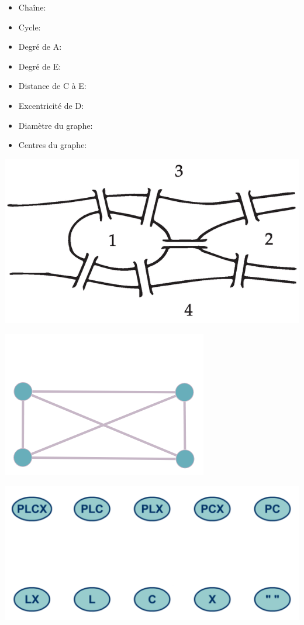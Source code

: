 \documentclass[a4paper,11pt]{article}
\begin{document}
\begin{multicols}{2}
\bfseries

\begin{itemize}[leftmargin=*]
	\item Chaîne:
	\item Cycle:
	\item Degré de A:
	\item Degré de E:
	\item Distance de C à E:
	\item Excentricité de D:
	\item Diamètre du graphe:
	\item Centres du graphe:
\end{itemize}

\columnbreak
\centering

\includegraphics[width=0.8\linewidth]{../images/Konigsberg1}

\includegraphics[width=0.6\linewidth]{../images/enveloppe1}

\includegraphics[width=\linewidth]{../images/loup_chevre_chou_vide}


\end{multicols}
\end{document}
